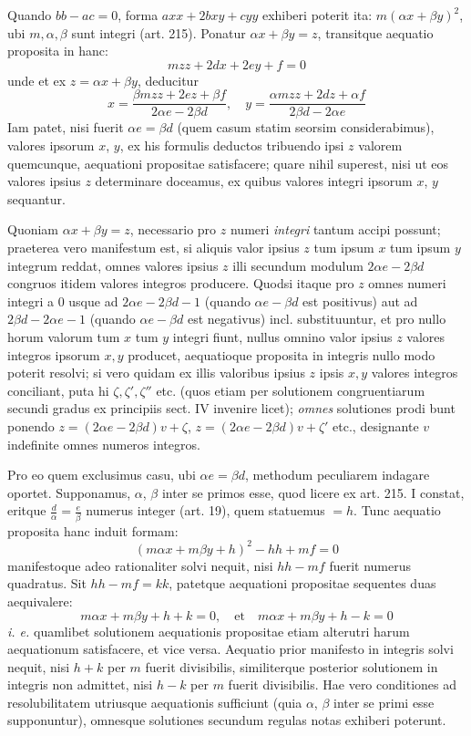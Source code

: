 Quando $bb-ac=0$, forma $axx+2bxy+cyy$ exhiberi poterit ita:
$m(\alpha x+\beta y)^2$, ubi $m,\alpha,\beta$ sunt integri (art. 215).
Ponatur $\alpha x+\beta y=z$, transitque aequatio proposita in hanc:
\[
mzz+2dx+2ey+f=0
\]
unde et ex $z=\alpha x+\beta y$, deducitur
\[
x=\frac{\beta mzz+2ez+\beta f}{2\alpha e-2\beta d},\quad
y=\frac{\alpha mzz+2dz+\alpha f}{2\beta d-2\alpha e}
\]
Iam patet, nisi fuerit $\alpha e=\beta d$ (quem casum statim seorsim considerabimus),
valores ipsorum $x$, $y$, ex his formulis deductos tribuendo ipsi $z$ valorem
quemcunque, aequationi propositae satisfacere; quare nihil superest, nisi ut eos
valores ipsius $z$ determinare doceamus, ex quibus valores integri ipsorum $x$, $y$
sequantur.

Quoniam $\alpha x+\beta y=z$, necessario pro $z$ numeri \textit{integri} tantum
accipi possunt; praeterea vero manifestum est, si aliquis valor ipsius $z$ tum
ipsum $x$ tum ipsum $y$ integrum reddat, omnes valores ipsius $z$ illi secundum
modulum $2\alpha e-2\beta d$ congruos itidem valores integros producere.
Quodsi itaque pro $z$ omnes numeri integri a $0$ usque ad $2\alpha e-2\beta d-1$
(quando $\alpha e-\beta d$ est positivus) aut ad $2\beta d-2\alpha e-1$
(quando $\alpha e-\beta d$ est negativus) incl. substituuntur, et pro nullo
horum valorum tum $x$ tum $y$ integri fiunt, nullus omnino valor ipsius $z$
valores integros ipsorum $x,y$ producet, aequatioque proposita in integris nullo
modo poterit resolvi; si vero quidam ex illis valoribus ipsius $z$ ipsis $x,y$
valores integros conciliant, puta hi $\zeta,\zeta',\zeta''$ etc. (quos etiam per
solutionem congruentiarum secundi gradus ex principiis sect. IV invenire licet);
\textit{omnes} solutiones prodi%
%
bunt ponendo $z=(2\alpha e-2\beta d)v+\zeta$,
$z=(2\alpha e-2\beta d)v+\zeta'$ etc., designante $v$ indefinite omnes numeros
integros.

Pro eo quem exclusimus casu, ubi $\alpha e=\beta d$, methodum peculiarem indagare
oportet. Supponamus, $\alpha$, $\beta$ inter se primos esse, quod licere ex
art. 215. I constat, eritque $\frac{d}{\alpha}=\frac{e}{\beta}$ numerus integer
(art. 19), quem statuemus $=h$. Tunc aequatio proposita hanc induit formam:
\[
(m\alpha x+m\beta y+h)^2-hh+mf=0
\]
manifestoque adeo rationaliter solvi nequit, nisi $hh-mf$ fuerit numerus quadratus.
Sit $hh-mf=kk$, patetque aequationi propositae sequentes duas aequivalere:
\[
m\alpha x+m\beta y+h+k=0,\quad\text{et}\quad
m\alpha x+m\beta y+h-k=0
\]
\textit{i. e.} quamlibet solutionem aequationis propositae etiam alterutri harum
aequationum satisfacere, et vice versa. Aequatio prior manifesto in integris solvi
nequit, nisi $h+k$ per $m$ fuerit divisibilis, similiterque posterior solutionem
in integris non admittet, nisi $h-k$ per $m$ fuerit divisibilis. Hae vero
conditiones ad resolubilitatem utriusque aequationis sufficiunt (quia $\alpha$,
$\beta$ inter se primi esse supponuntur), omnesque solutiones secundum regulas
notas exhiberi poterunt.

